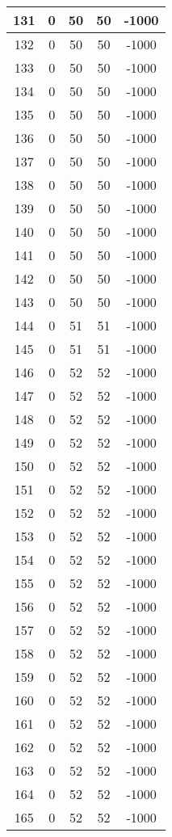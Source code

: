 \documentclass[letterpaper, 12pt]{article}
\begin{document}
\begin{longtable}{|c|c|c|c|c|}
\hline
131 & 0 & 50 & 50 & -1000 \\
\hline
132 & 0 & 50 & 50 & -1000 \\
\hline
133 & 0 & 50 & 50 & -1000 \\
\hline
134 & 0 & 50 & 50 & -1000 \\
\hline
135 & 0 & 50 & 50 & -1000 \\
\hline
136 & 0 & 50 & 50 & -1000 \\
\hline
137 & 0 & 50 & 50 & -1000 \\
\hline
138 & 0 & 50 & 50 & -1000 \\
\hline
139 & 0 & 50 & 50 & -1000 \\
\hline
140 & 0 & 50 & 50 & -1000 \\
\hline
141 & 0 & 50 & 50 & -1000 \\
\hline
142 & 0 & 50 & 50 & -1000 \\
\hline
143 & 0 & 50 & 50 & -1000 \\
\hline
144 & 0 & 51 & 51 & -1000 \\
\hline
145 & 0 & 51 & 51 & -1000 \\
\hline
146 & 0 & 52 & 52 & -1000 \\
\hline
147 & 0 & 52 & 52 & -1000 \\
\hline
148 & 0 & 52 & 52 & -1000 \\
\hline
149 & 0 & 52 & 52 & -1000 \\
\hline
150 & 0 & 52 & 52 & -1000 \\
\hline
151 & 0 & 52 & 52 & -1000 \\
\hline
152 & 0 & 52 & 52 & -1000 \\
\hline
153 & 0 & 52 & 52 & -1000 \\
\hline
154 & 0 & 52 & 52 & -1000 \\
\hline
155 & 0 & 52 & 52 & -1000 \\
\hline
156 & 0 & 52 & 52 & -1000 \\
\hline
157 & 0 & 52 & 52 & -1000 \\
\hline
158 & 0 & 52 & 52 & -1000 \\
\hline
159 & 0 & 52 & 52 & -1000 \\
\hline
160 & 0 & 52 & 52 & -1000 \\
\hline
161 & 0 & 52 & 52 & -1000 \\
\hline
162 & 0 & 52 & 52 & -1000 \\
\hline
163 & 0 & 52 & 52 & -1000 \\
\hline
164 & 0 & 52 & 52 & -1000 \\
\hline
165 & 0 & 52 & 52 & -1000 \\

\end{longtable}
\end{document}
